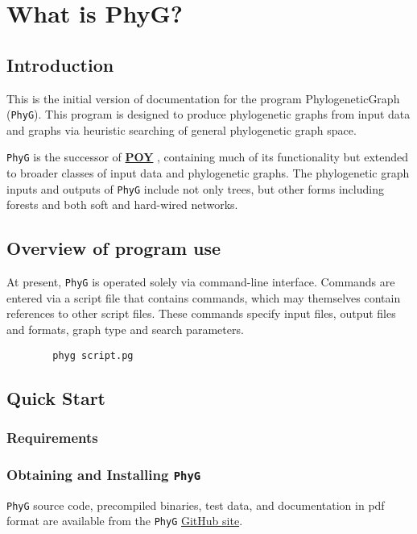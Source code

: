 \documentclass[11pt]{book}
\begin{document}
	
	\newpage
	
	\tableofcontents
	\newpage
	\chapter{What is PhyG?}
	\section{Introduction}
	This is the initial version of documentation for the program PhylogeneticGraph (\texttt{PhyG}).  
	This program is designed to produce phylogenetic graphs from input data and graphs via heuristic
	searching of general phylogenetic graph space.
	
	
	\texttt{PhyG} is the successor of \href{https://github.com/wardwheeler/POY5}{\textbf{POY}} \citep{POY2,POY3,POY4,Varonetal2010,POY5, Wheeleretal2015}, containing much of its functionality
	but extended to broader classes of input data and phylogenetic graphs.
	The phylogenetic graph inputs and outputs of \texttt{PhyG} include not only trees, but other forms
	including forests and both soft and hard-wired networks.
	
	
	\section{Overview of program use}
	
	At present, \texttt{PhyG} is operated solely via command-line interface. %
	Commands are entered via a script file that contains commands, which may themselves contain
	references to other script files.
	These commands specify input files, output files and formats, graph type and search parameters. 
	
	\begin{verbatim}
		phyg script.pg
	\end{verbatim}
	
	\section{Quick Start}
	\subsection{Requirements}
	\subsection{Obtaining and Installing \texttt{PhyG}}
	\texttt{PhyG} source code, precompiled binaries, test data, and documentation in pdf format are available from the	\texttt{PhyG} \href{https://githib.com/wardwheeler/PhyGraph}{GitHub site}.
	
\end{document}
